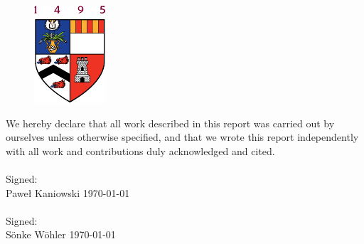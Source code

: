 \documentclass[main.tex]{subfiles}
\begin{document}
  \maketitle
  \thispagestyle{empty}
  
  \begin{figure}[h!]
    \centering
    \includegraphics{otherImages/abdnshield}
    \caption*{}
  \end{figure}
  
  \vfill
  We hereby declare that all work described in this report was carried out by ourselves unless otherwise specified, and that we wrote this report independently with all work and contributions duly acknowledged and cited.
  \\\\
  Signed:
  \\
  Pawe{\l} Kaniowski \hfil \today
  \\\\
  Signed: 
  \\
  S\"onke W\"ohler \hfil \today  
\end{document}
